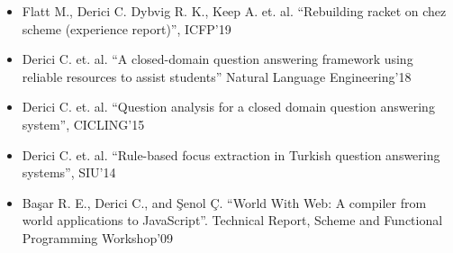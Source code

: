 

\begin{itemize}
\item Flatt M., Derici C. Dybvig R. K., Keep A. et. al. “Rebuilding racket on chez scheme (experience report)”, ICFP'19

\item Derici C. et. al. “A closed-domain question answering framework using reliable resources to assist students” \newline Natural Language Engineering'18

\item Derici C. et. al. “Question analysis for a closed domain question answering system”, CICLING'15

\item Derici C. et. al. “Rule-based focus extraction in Turkish question answering systems”, SIU'14

\item Başar R. E., Derici C., and Şenol Ç. “World With Web: A compiler from world applications to JavaScript”. Technical Report, Scheme and Functional Programming Workshop'09
\end{itemize}